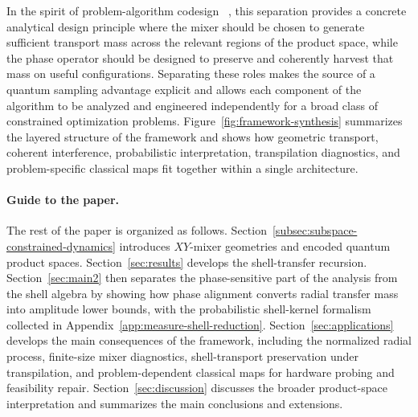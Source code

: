 \documentclass[a4paper,onecolumn,11pt,unpublished]{quantumarticle}
\theoremstyle{remark}
\begin{document}
In the spirit of problem-algorithm codesign ~\cite{Li2021CoDesign}, this separation provides a concrete analytical design principle where the mixer should be chosen to generate sufficient transport mass across the relevant regions of the product space, while the phase operator should be designed to preserve and coherently harvest that mass on useful configurations. Separating these roles makes the source of a quantum sampling advantage explicit and allows each component of the algorithm to be analyzed and engineered independently for a broad class of constrained optimization problems. Figure~\ref{fig:framework-synthesis} summarizes the layered structure of the framework and shows how geometric transport, coherent interference, probabilistic interpretation, transpilation diagnostics, and problem-specific classical maps fit together within a single architecture.


\paragraph{Guide to the paper.} The rest of the paper is organized as follows. Section~\ref{subsec:subspace-constrained-dynamics} introduces \(XY\)-mixer geometries and encoded quantum product spaces. Section~\ref{sec:results} develops the shell-transfer recursion. Section~\ref{sec:main2} then separates the phase-sensitive part of the analysis from the shell algebra by showing how phase alignment converts radial transfer mass into amplitude lower bounds, with the probabilistic shell-kernel formalism collected in Appendix~\ref{app:measure-shell-reduction}. Section~\ref{sec:applications} develops the main consequences of the framework, including the normalized radial process, finite-size mixer diagnostics, shell-transport preservation under transpilation, and
problem-dependent classical maps for hardware probing and feasibility repair. Section~\ref{sec:discussion} discusses the broader product-space interpretation and summarizes the main conclusions and extensions.


\end{document}

